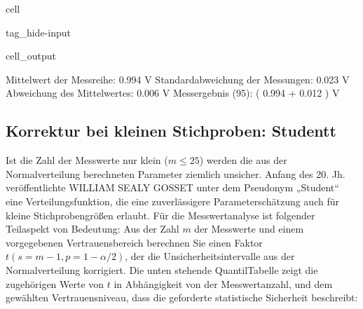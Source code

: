 \documentclass[letterpaper,10pt,english]{jupyterBook}
\begin{document}
\begin{sphinxuseclass}{cell}
\begin{sphinxuseclass}{tag_hide-input}\begin{sphinxVerbatimOutput}

\begin{sphinxuseclass}{cell_output}
\begin{sphinxVerbatim}[commandchars=\\\{\}]
Mittelwert der Messreihe:  0.994 V
Standardabweichung der Messungen:  0.023 V
Abweichung des Mittelwertes:  0.006 V
\PYGZhy{}\PYGZhy{}\PYGZhy{}\PYGZhy{}\PYGZhy{}\PYGZhy{}\PYGZhy{}\PYGZhy{}\PYGZhy{}\PYGZhy{}\PYGZhy{}\PYGZhy{}\PYGZhy{}\PYGZhy{}\PYGZhy{}\PYGZhy{}\PYGZhy{}\PYGZhy{}\PYGZhy{}\PYGZhy{}\PYGZhy{}\PYGZhy{}\PYGZhy{}\PYGZhy{}\PYGZhy{}\PYGZhy{}\PYGZhy{}\PYGZhy{}\PYGZhy{}\PYGZhy{}\PYGZhy{}\PYGZhy{}\PYGZhy{}\PYGZhy{}\PYGZhy{}\PYGZhy{}\PYGZhy{}\PYGZhy{}\PYGZhy{}\PYGZhy{}\PYGZhy{}\PYGZhy{}\PYGZhy{}\PYGZhy{}\PYGZhy{}\PYGZhy{}\PYGZhy{}\PYGZhy{}\PYGZhy{}\PYGZhy{}\PYGZhy{}\PYGZhy{}\PYGZhy{}\PYGZhy{}\PYGZhy{}\PYGZhy{}\PYGZhy{}\PYGZhy{}\PYGZhy{}\PYGZhy{}\PYGZhy{}\PYGZhy{}\PYGZhy{}\PYGZhy{}
Messergebnis (95\PYGZpc{}): ( 0.994 +\PYGZhy{} 0.012 ) V
\end{sphinxVerbatim}

\end{sphinxuseclass}\end{sphinxVerbatimOutput}

\end{sphinxuseclass}
\end{sphinxuseclass}

\subsection{Korrektur bei kleinen Stichproben: Student\sphinxhyphen{}t}
\label{\detokenize{content/1_Mittelwert_StdAbw:korrektur-bei-kleinen-stichproben-student-t}}
\sphinxAtStartPar
Ist die Zahl der Messwerte nur klein (\(m \leq 25\)) werden die aus der Normalverteilung berechneten Parameter ziemlich unsicher. Anfang des 20. Jh. veröffentlichte WILLIAM SEALY GOSSET unter dem Pseudonym „Student“ eine Verteilungsfunktion, die eine zuverlässigere Parameterschätzung auch für kleine Stichprobengrößen erlaubt. Für die Messwertanalyse ist folgender Teilaspekt von Bedeutung: Aus der Zahl \(m\) der Messwerte und einem vorgegebenen Vertrauensbereich berechnen Sie einen Faktor \(t(s=m-1, p=1-\alpha/2)\), der die Unsicherheitsintervalle aus der Normalverteilung korrigiert.
Die unten stehende Quantil\sphinxhyphen{}Tabelle zeigt die zugehörigen Werte von \(t\) in Abhängigkeit von der Messwertanzahl, und dem gewählten Vertrauensniveau, dass die geforderte statistische Sicherheit beschreibt:
\end{document}
